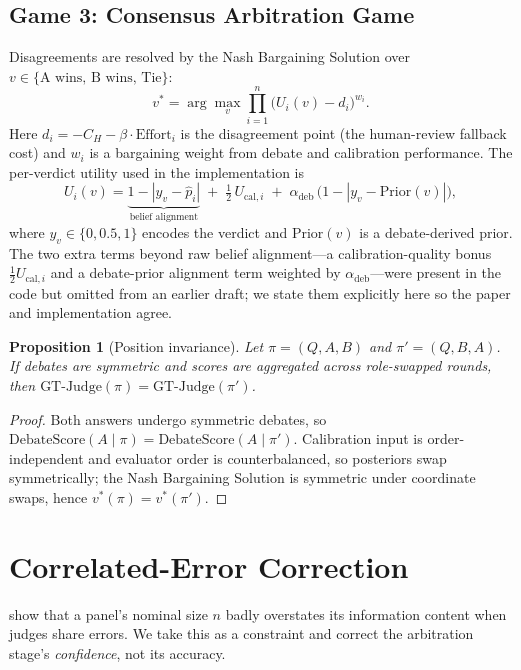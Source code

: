 \documentclass[11pt]{article}
\newtheorem{proposition}{Proposition}
\begin{document}
\subsection{Game 3: Consensus Arbitration Game}
Disagreements are resolved by the Nash Bargaining Solution over
$v\in\{\text{A wins, B wins, Tie}\}$:
\begin{equation}\label{eq:nash}
v^* = \arg\max_v \prod_{i=1}^{n}\big(U_i(v)-d_i\big)^{w_i}.
\end{equation}
Here $d_i=-C_H-\beta\cdot\mathrm{Effort}_i$ is the disagreement point (the
human-review fallback cost) and $w_i$ is a bargaining weight from debate and
calibration performance. The per-verdict utility used in the implementation is
\begin{equation}\label{eq:utility}
U_i(v) = \underbrace{1-|y_v-\hat p_i|}_{\text{belief alignment}}
\;+\; \tfrac{1}{2}\,U_{\mathrm{cal},i}
\;+\; \alpha_{\mathrm{deb}}\,\big(1-|y_v-\mathrm{Prior}(v)|\big),
\end{equation}
where $y_v\in\{0,0.5,1\}$ encodes the verdict and $\mathrm{Prior}(v)$ is a
debate-derived prior. The two extra terms beyond raw belief alignment---a
calibration-quality bonus $\tfrac12 U_{\mathrm{cal},i}$ and a debate-prior
alignment term weighted by $\alpha_{\mathrm{deb}}$---were present in the code but
omitted from an earlier draft; we state them explicitly here so the paper and
implementation agree.

\begin{proposition}[Position invariance]\label{prop:position}
Let $\pi=(Q,A,B)$ and $\pi'=(Q,B,A)$. If debates are symmetric and scores are
aggregated across role-swapped rounds, then $\text{GT-Judge}(\pi)=\text{GT-Judge}(\pi')$.
\end{proposition}
\begin{proof}
Both answers undergo symmetric debates, so $\mathrm{DebateScore}(A\mid\pi)=\mathrm{DebateScore}(A\mid\pi')$.
Calibration input is order-independent and evaluator order is counterbalanced,
so posteriors swap symmetrically; the Nash Bargaining Solution is symmetric
under coordinate swaps, hence $v^*(\pi)=v^*(\pi')$.
\end{proof}

\section{Correlated-Error Correction}\label{sec:correlation}
\citet{kohli2026} show that a panel's nominal size $n$ badly overstates its
information content when judges share errors. We take this as a constraint and
correct the arbitration stage's \emph{confidence}, not its accuracy.
\end{document}
